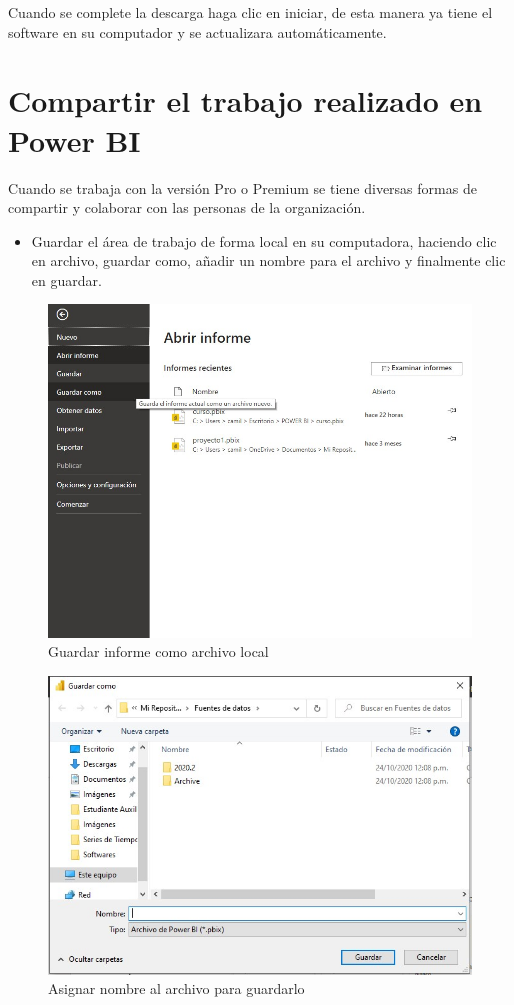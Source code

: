 \documentclass[
]{book}
\providecommand{\tightlist}{%
  \setlength{\itemsep}{0pt}\setlength{\parskip}{0pt}}
\begin{document}
Cuando se complete la descarga haga clic en iniciar, de esta manera ya tiene el software en su computador y se actualizara automáticamente.

\hypertarget{compartir-el-trabajo-realizado-en-power-bi}{%
\section{Compartir el trabajo realizado en Power BI}\label{compartir-el-trabajo-realizado-en-power-bi}}

Cuando se trabaja con la versión Pro o Premium se tiene diversas formas de compartir y colaborar con las personas de la organización.

\begin{itemize}
\tightlist
\item
  Guardar el área de trabajo de forma local en su computadora, haciendo clic en archivo, guardar como, añadir un nombre para el archivo y finalmente clic en guardar.
\end{itemize}

\begin{figure}

{\centering \includegraphics[width=0.6\linewidth]{Imágenes/powerbi1} 

}

\caption{Guardar informe como archivo local}\label{fig:guardarinforme-fig}
\end{figure}

\begin{figure}

{\centering \includegraphics[width=0.6\linewidth]{Imágenes/powerbi2} 

}

\caption{Asignar nombre al archivo para guardarlo}\label{fig:guardararchivo2-fig}
\end{figure}
\end{document}

